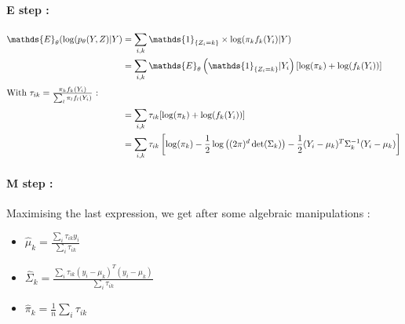 \documentclass[a4paper,10pt]{article}
\begin{document}
\paragraph{E step :}



\begin{align*}
\mathds{E}_\theta (\log(p_\theta(Y,Z)|Y) &= \sum_{i,k} \mathds{1}_{\{Z_i = k\}} \times \log(\pi_k f_k(Y_i)|Y)\\
&= \sum_{i,k} \mathds{E}_\theta \left( \mathds{1}_{\{Z_i = k\}} |Y_i\right)[\log(\pi_k) + \log(f_k(Y_i)) ]\\
\intertext{With $\tau_{ik} = \frac{\pi_k f_k(Y_i)}{\sum_{l} \pi_l f_l(Y_i)}$ :}
&= \sum_{i,k}\tau_{ik}[\log(\pi_k) + \log(f_k(Y_i)) ] \\
&= \sum_{i,k}\tau_{ik}\left[\log(\pi_k)-\frac{1}{2}\log\left((2\pi)^d\det(\Sigma_k)\right) - \frac{1}{2}(Y_i - \mu_k)^T\Sigma_k^{-1}(Y_i - \mu_k)\right] \\
\end{align*}


\paragraph{M step :}
Maximising the last expression, we get after some algebraic manipulations :
\begin{itemize}
\item \large{$\hat{\mu}_k = \frac{\sum_i \tau_{ik} y_i}{\sum_i \tau_{ik}}$}\normalsize
\item \large{$\hat{\Sigma}_k = \frac{\sum_i \tau_{ik} (y_i-\mu_k)^T(y_i-\mu_k)}{\sum_i \tau_{ik}}$}\normalsize
\item \large{$\hat{\pi}_k = \frac{1}{n} \sum_i \tau_{ik}$}
\end{itemize}
\end{document}
